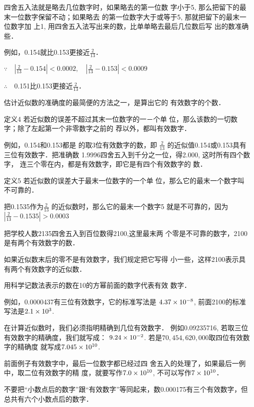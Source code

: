 四舍五入法就是略去几位数字时，如果略去的第一位数
字小于5, 那么把留下的最末一位数字保留不动；如果略去
的第一位数字大于或等于5, 那就把留下的最末一位数字加
上1, 用四舍五入法写出来的数，比单单略去最后几位数后写
出的数准确些．

例如，0.154就比0.153更接近$\frac{2}{13}$．

$\because\quad \left|\frac{2}{13}-0.154\right|<0.0002,\quad \left|\frac{2}{13}-0.153\right|<0.0009$

$\therefore\quad $0.151比0.153更接近$\frac{2}{13}$．

估计近似数的准确度的最简便的方法之一，是算出它的
有效数字的个数．

\begin{blk}{定义4}
    若近似数的误差不超过其末一位数字的一－个单
位，那么该数的一切数字；除了左起第一个非零数字之前的
荐以外，都叫有效数字．
\end{blk}


例如，0.154和0.153都是
的取3位有效数字的数，即
$\frac{2}{13}$
的近似值0.154或0.153具有三位有效数字．把准确数
1.9996四舍五入到千分之一位，得2.000, 这时所有四个数字，
连三个零在内，都是有效数字，即它是有四个有效数字的
数．

\begin{blk}{定义5}
    若近似数的误差大于最末一位数字的一个单
    位，那么它的最末一个数字叫不可靠的．  
\end{blk}

把0.1535作为$\frac{2}{13}$
的近似数时，那么它的最末一个数字5
就是不可靠的，因为
$\left|\frac{2}{13}-0.1535\right|>0.0003$

把学校人数2135四舍五入到百位数得2100,这里最末两
个零是不可靠的数字，2100是有两个有效数字的数．

如果近似数末后的零不是有效数字，我们规定把它写得
小一些，这样21{\small00}表示具有两个有效数字的近似数．

用科学记数法表示的数在10的方幂前面的数字代表有效
数字．

例如，0.0000437有三位有效数字，它的标准写法是
$4.37\times10^{-8}$, 前面2100的标准写法是$2.1\times10^3$.

在计算近似数时，我们必须指明精确到几位有效数字．
例如0.09235716, 若取三位有效数字的精确度，我们就写成：
$9.24\times10^{-2}$. 若是$70,454,620,000$取四位有效数字的精确度
就写成$7.045\times10^{10}$.

\begin{rmk}
前面例子有效数字中，最后一位数字都已经过四
舍五入的处理了，如果最后一例中，取二位有效数字的精
度，就要写作$7.0\times10^{10}$, 不可以写作$7\times10^{10}$．  

不要把“小数点后的数字”跟“有效数字”等同起来，数0.000175有三个有效数字，但总共有六个小数点后的数字．
\end{rmk}

